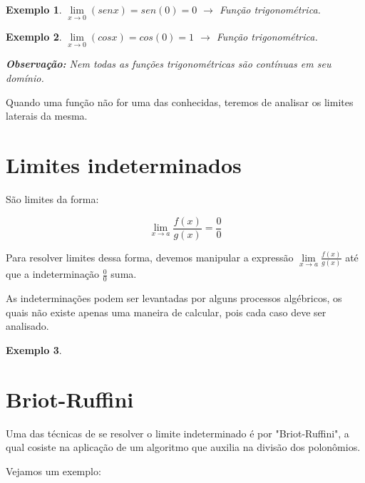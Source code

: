 \documentclass{book}
\numberwithin{defn}{chapter}
\newtheorem{exe}{Exemplo}
\numberwithin{exe}{chapter}
\numberwithin{ex}{chapter}
\numberwithin{obs}{chapter}
\numberwithin{fato}{chapter}
\numberwithin{resp}{chapter}
\begin{document}
\begin{exe}
    $\lim\limits_{x\to 0}(sen x) = sen(0)=0$ $\rightarrow$ Função trigonométrica.
\end{exe}

\begin{exe}
    $\lim\limits_{x\to 0}(cos x) = cos(0)=1$ $\rightarrow$ Função trigonométrica.

\item\textbf{Observação:} Nem todas as funções trigonométricas são contínuas em seu domínio.
\end{exe}

Quando uma função não for uma das conhecidas, teremos de analisar os limites laterais da mesma.



\section{Limites indeterminados} 
São limites da forma:

\[\lim\limits_{x\to a}\frac{f(x)}{g(x)}=\frac{0}{0}\]

Para resolver limites dessa forma, devemos manipular a expressão $\lim\limits_{x\to a}\frac{f(x)}{g(x)}$ até que a indeterminação $\frac{0}{0}$ suma.

As indeterminações podem ser levantadas por alguns processos algébricos, os quais não existe apenas uma maneira de calcular, pois cada caso deve ser analisado.

\begin{exe}
\end{exe}

\section{Briot-Ruffini}
\text{ }

Uma das técnicas de se resolver o limite indeterminado é por "Briot-Ruffini", a qual cosiste na aplicação de um algoritmo que auxilia na divisão dos polonômios.

Vejamos um exemplo:
\end{document}
